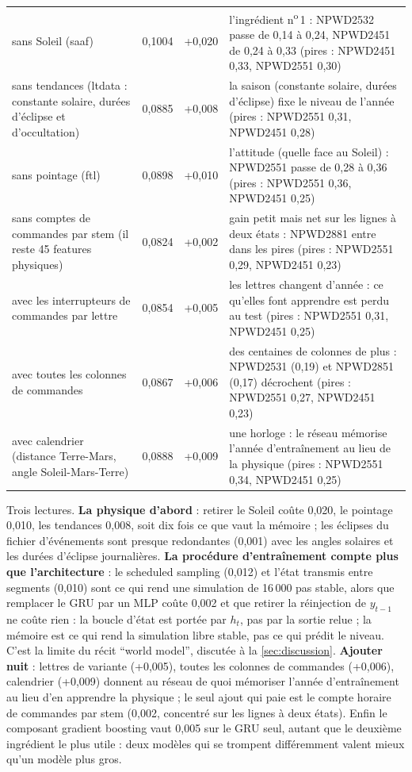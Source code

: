 \documentclass[11pt,a4paper]{article}
\begin{document}
\begin{table}[htbp]
\begin{tabularx}{\textwidth}{L{4.4cm} c c Y}
sans Soleil (saaf) & 0,1004 & +0,020 & l'ingrédient n\textsuperscript{o}\,1 : NPWD2532 passe de 0,14 à 0,24, NPWD2451 de 0,24 à 0,33 (pires : NPWD2451 0,33, NPWD2551 0,30) \\
sans tendances (ltdata : constante solaire, durées d'éclipse et d'occultation) & 0,0885 & +0,008 & la saison (constante solaire, durées d'éclipse) fixe le niveau de l'année (pires : NPWD2551 0,31, NPWD2451 0,28) \\
sans pointage (ftl) & 0,0898 & +0,010 & l'attitude (quelle face au Soleil) : NPWD2551 passe de 0,28 à 0,36 (pires : NPWD2551 0,36, NPWD2451 0,25) \\
sans comptes de commandes par stem (il reste 45 features physiques) & 0,0824 & +0,002 & gain petit mais net sur les lignes à deux états : NPWD2881 entre dans les pires (pires : NPWD2551 0,29, NPWD2451 0,23) \\
avec les interrupteurs de commandes par lettre & 0,0854 & +0,005 & les lettres changent d'année : ce qu'elles font apprendre est perdu au test (pires : NPWD2551 0,31, NPWD2451 0,25) \\
avec toutes les colonnes de commandes & 0,0867 & +0,006 & des centaines de colonnes de plus : NPWD2531 (0,19) et NPWD2851 (0,17) décrochent (pires : NPWD2551 0,27, NPWD2451 0,23) \\
avec calendrier (distance Terre-Mars, angle Soleil-Mars-Terre) & 0,0888 & +0,009 & une horloge : le réseau mémorise l'année d'entraînement au lieu de la physique (pires : NPWD2551 0,34, NPWD2451 0,25) \\
\bottomrule
\end{tabularx}
\end{table}

Trois lectures. \textbf{La physique d'abord} : retirer le Soleil coûte 0,020, le pointage 0,010, les tendances 0,008, soit dix fois ce que vaut la mémoire ; les éclipses du fichier d'événements sont presque redondantes (0,001) avec les angles solaires et les durées d'éclipse journalières. \textbf{La procédure d'entraînement compte plus que l'architecture} : le scheduled sampling (0,012) et l'état transmis entre segments (0,010) sont ce qui rend une simulation de 16\,000 pas stable, alors que remplacer le GRU par un MLP coûte 0,002 et que retirer la réinjection de $y_{t-1}$ ne coûte rien : la boucle d'état est portée par $h_t$, pas par la sortie relue ; la mémoire est ce qui rend la simulation libre stable, pas ce qui prédit le niveau. C'est la limite du récit \enquote{world model}, discutée à la \autoref{sec:discussion}. \textbf{Ajouter nuit} : lettres de variante (+0,005), toutes les colonnes de commandes (+0,006), calendrier (+0,009) donnent au réseau de quoi mémoriser l'année d'entraînement au lieu d'en apprendre la physique ; le seul ajout qui paie est le compte horaire de commandes par stem (0,002, concentré sur les lignes à deux états). Enfin le composant gradient boosting vaut 0,005 sur le GRU seul, autant que le deuxième ingrédient le plus utile : deux modèles qui se trompent différemment valent mieux qu'un modèle plus gros.
\end{document}
